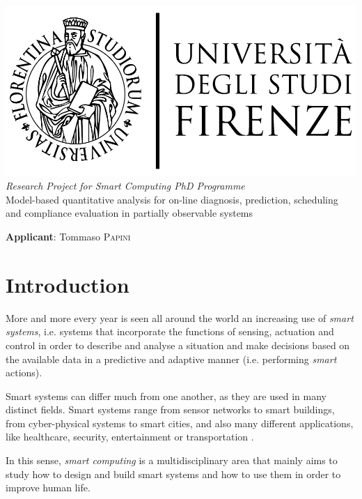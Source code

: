 \documentclass{article}
\begin{document}
    
    \begin{center}
        \includegraphics[scale=0.2]{logo_unifi.jpg}\\[4cm]
        \textit{Research Project for Smart Computing PhD Programme}\\[0.3cm]
        {\Huge Model-based quantitative analysis for on-line diagnosis, prediction, scheduling and compliance evaluation in partially observable systems}
    \end{center}
    
    \vfill
    
    \textbf{Applicant}: Tommaso \textsc{Papini}
    
    \clearpage
    
    \section*{Introduction}
    
        More and more every year is seen all around the world an increasing use of \textit{smart systems}, i.e. systems that incorporate the functions of sensing, actuation and control in order to describe and analyse a situation and make decisions based on the available data in a predictive and adaptive manner (i.e. performing \textit{smart} actions).
        
        Smart systems can differ much from one another, as they are used in many distinct fields. Smart systems range from sensor networks to smart buildings, from cyber-physical systems to smart cities, and also many different applications, like healthcare, security, entertainment or transportation \cite{akhras2000smart, smartcomp}.
        
        In this sense, \textit{smart computing} is a multidisciplinary area that mainly aims to study how to design and build smart systems and how to use them in order to improve human life.
        
\end{document}
